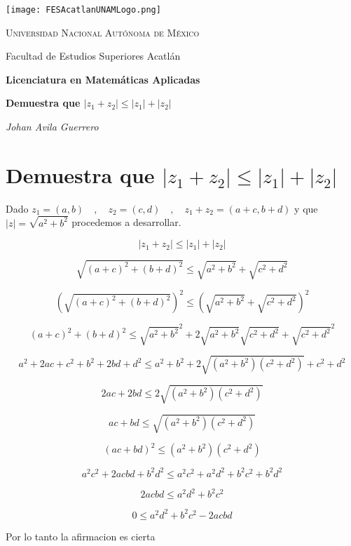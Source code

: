 \documentclass[a4paper,12pt]{article}
\begin{document}
\begin{titlepage}
    \centering
    \texttt{[image: FESAcatlanUNAMLogo.png]} %
    \vspace{1cm}
    
    {\scshape\large Universidad Nacional Autónoma de México \par}
    {\large Facultad de Estudios Superiores Acatlán \par}
    \vspace{1.5cm}
    
    {\Large\bfseries Licenciatura en Matemáticas Aplicadas \par}
    \vspace{2cm}
    
    {\Huge\bfseries Demuestra que  \(|z_1 + z_2| \leq |z_1| + |z_2| \)

    \par}
    \vspace{2cm}
    
    {\Large\itshape Johan Avila Guerrero \par}
    \vfill
    
    
    \vfill
    
\end{titlepage}



\section{Demuestra que \(| z_1 + z_2| \leq |z_1| + |z_2| \)}
Dado \(z_1=(a,b) \quad, \quad z_2=(c,d) \quad, \quad z_1+z_2=(a+c,b+d) \) y que  \(|z|=\sqrt{a^2 + b^2 } \)  procedemos a desarrollar.

\[| z_1 + z_2| \leq |z_1| + |z_2|\] 

\[\sqrt{(a+c)^2 +(b+d)^2} \leq \sqrt{a^2 +b^2} + \sqrt{c^2 +d^2} \] 

\[(\sqrt{(a+c)^2 +(b+d)^2})^2 \leq (\sqrt{a^2 +b^2} + \sqrt{c^2 +d^2})^2 \] 

\[(a+c)^2 +(b+d)^2 \leq \sqrt{a^2 +b^2}^2+ 2\sqrt{a^2 +b^2}\sqrt{c^2 +d^2}  + \sqrt{c^2 +d^2}^2 \] 

\[a^2+2ac+ c^2 + b^2 + 2bd + d^2 \leq a^2 +b^2 + 2\sqrt{(a^2 +b^2 )(c^2 +d^2)}  + c^2 +d^2 \] 

\[2ac + 2bd \leq 2\sqrt{(a^2 +b^2 )(c^2 +d^2)} \]

\[ac + bd \leq \sqrt{(a^2 +b^2 )(c^2 +d^2)} \]

\[(ac + bd)^2 \leq (a^2 +b^2 )(c^2 +d^2) \]

\[ a^2c^2  +2acbd+ b^2d^2 \leq a^2 c^2 +a^2 d^2 +b^2 c^2 + b^2 d^2   \]

\[   2acbd \leq a^2 d^2 +b^2 c^2   \]

\[   0 \leq a^2 d^2 +b^2 c^2 - 2acbd    \]

Por lo tanto la afirmacion es cierta
\end{document}
